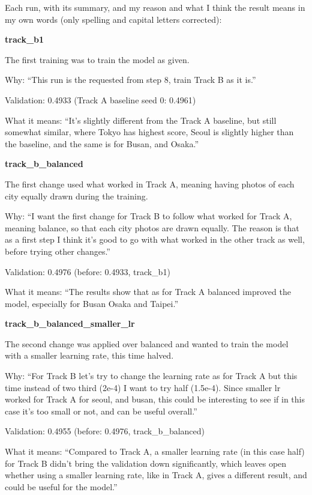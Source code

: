 \documentclass[11pt]{article}
\begin{document}
Each run, with its summary, and my reason and what I think the result means in my own words (only spelling and capital letters corrected):
{\small
\par\medskip\noindent\textbf{track\_b1}\par
The first training was to train the model as given.\par
Why: ``This run is the requested from step 8, train Track B as it is.''\par
Validation: 0.4933 (Track A baseline seed 0: 0.4961)\par
What it means: ``It's slightly different from the Track A baseline, but still somewhat similar, where Tokyo has highest score, Seoul is slightly higher than the baseline, and the same is for Busan, and Osaka.''
\par\medskip\noindent\textbf{track\_b\_balanced}\par
The first change used what worked in Track A, meaning having photos of each city equally drawn during the training.\par
Why: ``I want the first change for Track B to follow what worked for Track A, meaning balance, so that each city photos are drawn equally. The reason is that as a first step I think it's good to go with what worked in the other track as well, before trying other changes.''\par
Validation: 0.4976 (before: 0.4933, track\_b1)\par
What it means: ``The results show that as for Track A balanced improved the model, especially for Busan Osaka and Taipei.''
\par\medskip\noindent\textbf{track\_b\_balanced\_smaller\_lr}\par
The second change was applied over balanced and wanted to train the model with a smaller learning rate, this time halved.\par
Why: ``For Track B let's try to change the learning rate as for Track A but this time instead of two third (2e-4) I want to try half (1.5e-4). Since smaller lr worked for Track A for seoul, and busan, this could be interesting to see if in this case it's too small or not, and can be useful overall.''\par
Validation: 0.4955 (before: 0.4976, track\_b\_balanced)\par
What it means: ``Compared to Track A, a smaller learning rate (in this case half) for Track B didn't bring the validation down significantly, which leaves open whether using a smaller learning rate, like in Track A, gives a different result, and could be useful for the model.''
}
\end{document}
